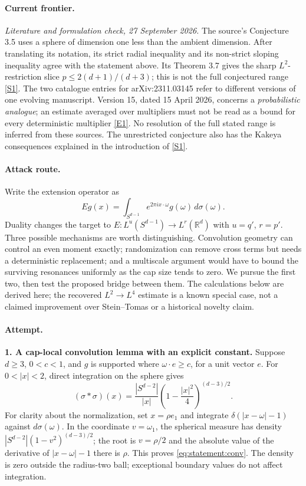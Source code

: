 \documentclass[11pt,a4paper]{article}
\newcommand{\R}{\mathbb{R}}
\newcommand{\sref}[2]{\hyperlink{source:#1:#2}{[S#2]}}
\newcommand{\eref}[2]{\hyperlink{extra:#1:#2}{[E#2]}}
\numberwithin{equation}{section}
\begin{document}
\paragraph{Current frontier.}
\textit{Literature and formulation check, 27 September 2026.}
The source's Conjecture 3.5 uses a sphere of dimension one less than the
ambient dimension. After translating its notation, its strict radial
inequality and its non-strict sloping inequality agree with the statement
above. Its Theorem 3.7 gives the sharp $L^2$-restriction slice
$p\le 2(d+1)/(d+3)$; this is not the full conjectured range
\sref{statement}{1}. The two catalogue entries for arXiv:2311.03145 refer to different
versions of one evolving manuscript. Version 15, dated 15 April 2026, concerns
a \emph{probabilistic analogue}; an estimate averaged over multipliers must
not be read as a bound for every deterministic multiplier
\eref{statement}{1}. No resolution of the full stated range is inferred from these
sources. The unrestricted conjecture also has the Kakeya consequences
explained in the introduction of \sref{statement}{1}.

\paragraph{Attack route.}
Write the extension operator as
\[
 Eg(x)=\int_{S^{d-1}} e^{2\pi i x\cdot\omega}g(\omega)\,d\sigma(\omega).
\]
Duality changes the target to $E:L^u(S^{d-1})\to L^r(\R^d)$ with
$u=q'$, $r=p'$. Three possible mechanisms are worth distinguishing.
Convolution geometry can control an even moment exactly; randomization can
remove cross terms but needs a deterministic replacement; and a multiscale
argument would have to bound the surviving resonances uniformly as the cap
size tends to zero. We pursue the first two, then test the proposed bridge
between them. The calculations below are derived here; the recovered
$L^2\to L^4$ estimate is a known special case, not a claimed improvement over
Stein--Tomas or a historical novelty claim.

\paragraph{Attempt.}
\textbf{1. A cap-local convolution lemma with an explicit constant.}
Suppose $d\ge3$, $0<c<1$, and $g$ is supported where
$\omega\cdot e\ge c$, for a unit vector $e$. For $0<|x|<2$, direct
integration on the sphere gives
\begin{equation}\label{eq:statement:conv}
 (\sigma*\sigma)(x)=\frac{|S^{d-2}|}{|x|}
       \left(1-\frac{|x|^2}{4}\right)^{(d-3)/2}.
\end{equation}
For clarity about the normalization, set $x=\rho e_1$ and integrate
$\delta(|x-\omega|-1)$ against $d\sigma(\omega)$. In the coordinate
$v=\omega_1$, the spherical measure has density
$|S^{d-2}|(1-v^2)^{(d-3)/2}$; the root is $v=\rho/2$ and the absolute
value of the derivative of $|x-\omega|-1$ there is $\rho$. This proves
\eqref{eq:statement:conv}. The density is zero outside the radius-two ball;
exceptional boundary values do not affect integration.
\end{document}
